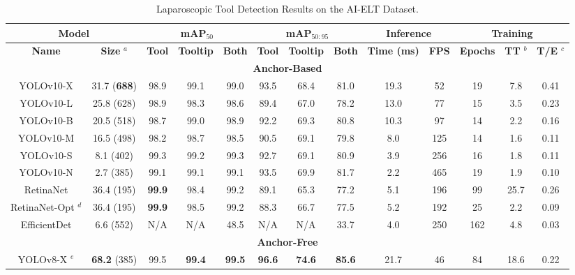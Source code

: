 \footnotesize
\begin{table}[htbp]
    \centering
    \caption{Laparoscopic Tool Detection Results on the AI-ELT Dataset.}
    \vspace*{-3mm}
    \label{fig:modelresults}
    \begin{tabular}{|c|c|c|c|c|c|c|c|c|c|c|c|c|}
    \hline
    \multicolumn{2}{|c|}{\textbf{Model}} & \multicolumn{3}{c|}{\textbf{mAP$_{50}$}} & \multicolumn{3}{c|}{\textbf{mAP$_{50:95}$}} & \multicolumn{2}{c|}{\textbf{Inference}} & \multicolumn{3}{c|}{\textbf{Training}} \\
    \hline
    \textbf{Name} & \textbf{Size} $^a$ & \textbf{Tool} & \textbf{Tooltip} & \textbf{Both} & \textbf{Tool} & \textbf{Tooltip} & \textbf{Both} & \textbf{Time (ms)} & \textbf{FPS} & \textbf{Epochs} & \textbf{TT} $^b$ & \textbf{T/E} $^c$ \\ 
    \hline
    \multicolumn{13}{|c|}{\textbf{Anchor-Based}} \\
    \hline
    YOLOv10-X & 31.7 (\textbf{688}) & 98.9 & 99.1 & 99.0 & 93.5 & 68.4 & 81.0 & 19.3 & 52 & 19 & 7.8 & 0.41 \\ 
    YOLOv10-L & 25.8 (628) & 98.9 & 98.3 & 98.6 & 89.4 & 67.0 & 78.2 & 13.0 & 77 & 15 & 3.5 & 0.23 \\ 
    YOLOv10-B & 20.5 (518) & 98.7 & 99.0 & 98.9 & 92.2 & 69.3 & 80.8 & 10.3 & 97 & 14 & 2.2 & 0.16 \\ 
    YOLOv10-M & 16.5 (498) & 98.2 & 98.7 & 98.5 & 90.5 & 69.1 & 79.8 & 8.0 & 125 & 14 & 1.6 & 0.11 \\ 
    YOLOv10-S & 8.1 (402) & 99.3 & 99.2 & 99.3 & 92.7 & 69.1 & 80.9 & 3.9 & 256 & 16 & 1.8 & 0.11 \\ 
    YOLOv10-N & 2.7 (385) & 99.1 & 99.1 & 99.1 & 93.5 & 69.9 & 81.7 & 2.2 & 465 & 19 & 1.9 & 0.10 \\ 
    RetinaNet & 36.4 (195) & \textbf{99.9} & 98.4 & 99.2 & 89.1 & 65.3 & 77.2 & 5.1 & 196 & 99 & 25.7 & 0.26 \\ 
    RetinaNet-Opt $^d$ & 36.4 (195) & \textbf{99.9} & 98.5 & 99.2 & 88.3 & 66.7 & 77.5 & 5.2 & 192 & 25 & 2.2 & 0.09 \\ 
    EfficientDet & 6.6 (552) & N/A & N/A & 48.5 & N/A & N/A & 33.7 & 4.0 & 250 & 162 & 4.8 & 0.03 \\ 
    \hline
    \multicolumn{13}{|c|}{\textbf{Anchor-Free}} \\
    \hline
    \rowcolor{yellow} YOLOv8-X $^e$ & \textbf{68.2} (385) & 99.5 & \textbf{99.4} & \textbf{99.5} & \textbf{96.6} & \textbf{74.6} & \textbf{85.6} & 21.7 & 46 & 84 & 18.6 & 0.22 \\ 

\end{tabular}
\end{table}
